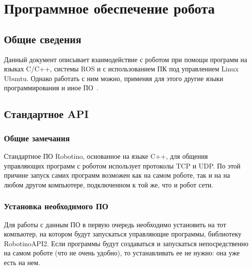 \chapter{Программное обеспечение робота}
\section{Общие сведения}
Данный документ описывает взаимодействие с роботом при помощи программ на языках C/C++, системы ROS и с использованием ПК под управлением Linux Ubuntu.
Однако работать с ним можно, применяя для этого другие языки программирования и иное ПО~\cite{wiki_openrobotino}.



\section{Стандартное API}
\subsection{Общие замечания}
Стандартное ПО Robotino, основанное на языке C++, для общения управляющих программ с роботом использует протоколы TCP и UDP.
По этой причине запуск самих программ возможен как на самом роботе, так и на на любом другом компьютере, подключенном к той же, что и робот сети.



\subsection{Установка необходимого ПО}\label{part_robotinoapi2_installation}
Для работы с данным ПО в первую очередь необходимо установить на тот компьютер, на котором будут запускаться управляющие программы, библиотеку RobotinoAPI2.
Если программы будут создаваться и запускаться непосредственно на самом роботе (что не очень удобно), то устанавливать ее не нужно: она уже есть на нем.

